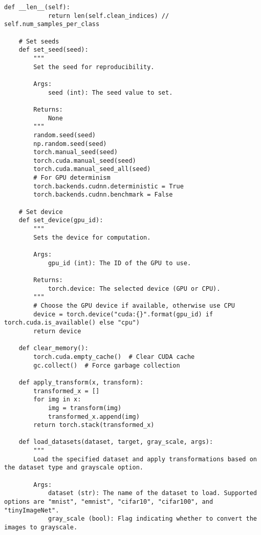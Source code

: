 \begin{lstlisting}[style=pythonstyle, caption={Program Example}]
        def __len__(self):
            return len(self.clean_indices) // self.num_samples_per_class
    
    # Set seeds
    def set_seed(seed):
        """
        Set the seed for reproducibility.
    
        Args:
            seed (int): The seed value to set.
    
        Returns:
            None
        """
        random.seed(seed)
        np.random.seed(seed)
        torch.manual_seed(seed)
        torch.cuda.manual_seed(seed)
        torch.cuda.manual_seed_all(seed)
        # For GPU determinism
        torch.backends.cudnn.deterministic = True
        torch.backends.cudnn.benchmark = False
    
    # Set device
    def set_device(gpu_id):
        """
        Sets the device for computation.
    
        Args:
            gpu_id (int): The ID of the GPU to use.
    
        Returns:
            torch.device: The selected device (GPU or CPU).
        """
        # Choose the GPU device if available, otherwise use CPU
        device = torch.device("cuda:{}".format(gpu_id) if torch.cuda.is_available() else "cpu")
        return device
    
    def clear_memory():
        torch.cuda.empty_cache()  # Clear CUDA cache
        gc.collect()  # Force garbage collection
    
    def apply_transform(x, transform):
        transformed_x = []
        for img in x:
            img = transform(img)
            transformed_x.append(img)
        return torch.stack(transformed_x)
    
    def load_datasets(dataset, target, gray_scale, args):
        """
        Load the specified dataset and apply transformations based on the dataset type and grayscale option.
        
        Args:
            dataset (str): The name of the dataset to load. Supported options are "mnist", "emnist", "cifar10", "cifar100", and "tinyImageNet".
            gray_scale (bool): Flag indicating whether to convert the images to grayscale.
            

\end{lstlisting}
